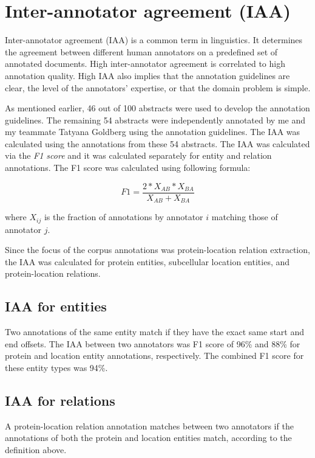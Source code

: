 \section{Inter-annotator agreement (IAA)}

Inter-annotator agreement (IAA) is a common term in linguistics. It determines the agreement between different human annotators on a predefined set of annotated documents. High inter-annotator agreement is correlated to high annotation quality. High IAA also implies that the annotation guidelines are clear, the level of the annotators' expertise, or that the domain problem is simple.

As mentioned earlier, 46 out of 100 abstracts were used to develop the annotation guidelines. The remaining 54 abstracts were independently annotated by me and my teammate Tatyana Goldberg using the annotation guidelines. The IAA was calculated using the annotations from these 54 abstracts. The IAA was calculated via the \emph{F1 score} and it was calculated separately for entity and relation annotations. The F1 score was calculated using following formula:

$$
F1 = \frac{2*X_{AB}*X_{BA}}{X_{AB}+X_{BA}}
$$

where $X_{ij}$ is the fraction of annotations by annotator $i$ matching those of annotator $j$.

Since the focus of the corpus annotations was protein-location relation extraction, the IAA was calculated for protein entities, subcellular location entities, and protein-location relations.

\subsection*{IAA for entities}

Two annotations of the same entity match if they have the exact same start and end offsets. The IAA between two annotators was F1 score of 96\% and 88\% for protein and location entity annotations, respectively. The combined F1 score for these entity types was 94\%. %

\subsection*{IAA for relations}

A protein-location relation annotation matches between two annotators if the annotations of both the protein and location entities match, according to the definition above.

